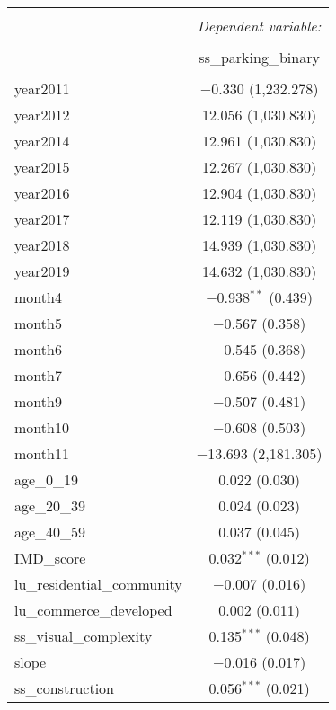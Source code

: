 \begin{table}[!htbp] \centering 
  \caption{} 
  \label{} 
\small 
\begin{tabular}{@{\extracolsep{1pt}}lc} 
\\[-1.8ex]\hline 
\hline \\[-1.8ex] 
 & \multicolumn{1}{c}{\textit{Dependent variable:}} \\ 
\cline{2-2} 
\\[-1.8ex] & ss\_parking\_binary \\ 
\hline \\[-1.8ex] 
 year2011 & $-$0.330 (1,232.278) \\ 
  year2012 & 12.056 (1,030.830) \\ 
  year2014 & 12.961 (1,030.830) \\ 
  year2015 & 12.267 (1,030.830) \\ 
  year2016 & 12.904 (1,030.830) \\ 
  year2017 & 12.119 (1,030.830) \\ 
  year2018 & 14.939 (1,030.830) \\ 
  year2019 & 14.632 (1,030.830) \\ 
  month4 & $-$0.938$^{**}$ (0.439) \\ 
  month5 & $-$0.567 (0.358) \\ 
  month6 & $-$0.545 (0.368) \\ 
  month7 & $-$0.656 (0.442) \\ 
  month9 & $-$0.507 (0.481) \\ 
  month10 & $-$0.608 (0.503) \\ 
  month11 & $-$13.693 (2,181.305) \\ 
  age\_0\_19 & 0.022 (0.030) \\ 
  age\_20\_39 & 0.024 (0.023) \\ 
  age\_40\_59 & 0.037 (0.045) \\ 
  IMD\_score & 0.032$^{***}$ (0.012) \\ 
  lu\_residential\_community & $-$0.007 (0.016) \\ 
  lu\_commerce\_developed & 0.002 (0.011) \\ 
  ss\_visual\_complexity & 0.135$^{***}$ (0.048) \\ 
  slope & $-$0.016 (0.017) \\ 
  ss\_construction & 0.056$^{***}$ (0.021) \\ 

\end{tabular}
\end{table}
